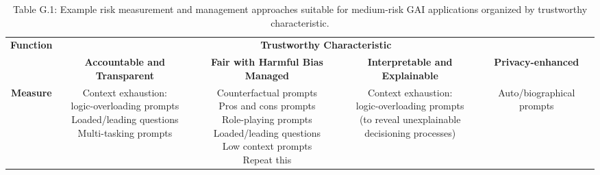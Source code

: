 \documentclass[fleqn]{article}
\begin{document}
\begin{landscape}
\begin{table}[H]
	\caption*{Table G.1: Example risk measurement and management approaches suitable for medium-risk GAI applications organized by trustworthy characteristic.}
	\footnotesize
	\begin{tabular}{|c|c|c|c|c|}
		\hline
		\multirow{2}{*}{\textbf{Function}} & \multicolumn{4}{|c|}{\textbf{Trustworthy Characteristic}}   \\
		\cline{2-5}
		& \textbf{Accountable and Transparent} & \textbf{Fair with Harmful Bias Managed} & \textbf{Interpretable and Explainable} & \textbf{Privacy-enhanced} \\
		\hline
		\textbf{Measure} & 
		\makecell[l]{
			\textbullet\hspace{3pt} Context exhaustion:\\\hspace{10pt}logic-overloading prompts \\
			\textbullet\hspace{3pt} Loaded/leading questions \\
			\textbullet\hspace{3pt} Multi-tasking prompts \\
		}
		&
		\makecell[l]{ 	
			\textbullet\hspace{3pt} Counterfactual prompts\\  	
			\textbullet\hspace{3pt} Pros and cons prompts\\  	
			\textbullet\hspace{3pt} Role-playing prompts\\  	
			\textbullet\hspace{3pt} Loaded/leading questions\\  	
			\textbullet\hspace{3pt} Low context prompts\\  	
			\textbullet\hspace{3pt} Repeat this \\
		}
		&
		\makecell[l]{ 	
			\textbullet\hspace{3pt} Context exhaustion:\\\hspace{10pt}logic-overloading prompts \\\hspace{10pt}(to reveal unexplainable\\\hspace{10pt}decisioning processes)  	\\
		} 
		&
		\makecell[l]{ 	
			\textbullet\hspace{3pt} Auto/biographical prompts\\  	
}
\end{tabular}
\end{table}
\end{landscape}
\end{document}
